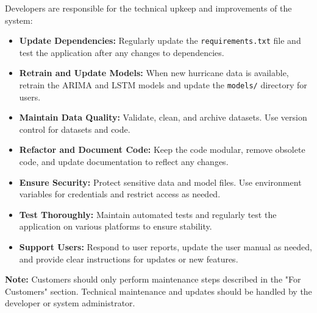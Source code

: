 Developers are responsible for the technical upkeep and improvements of the system:
\begin{itemize}
	\item \textbf{Update Dependencies:} Regularly update the \texttt{requirements.txt} file and test the application after any changes to dependencies.
	\item \textbf{Retrain and Update Models:} When new hurricane data is available, retrain the ARIMA and LSTM models and update the \texttt{models/} directory for users.
	\item \textbf{Maintain Data Quality:} Validate, clean, and archive datasets. Use version control for datasets and code.
	\item \textbf{Refactor and Document Code:} Keep the code modular, remove obsolete code, and update documentation to reflect any changes.
	\item \textbf{Ensure Security:} Protect sensitive data and model files. Use environment variables for credentials and restrict access as needed.
	\item \textbf{Test Thoroughly:} Maintain automated tests and regularly test the application on various platforms to ensure stability.
	\item \textbf{Support Users:} Respond to user reports, update the user manual as needed, and provide clear instructions for updates or new features.
\end{itemize}

\textbf{Note:} Customers should only perform maintenance steps described in the "For Customers" section. Technical maintenance and updates should be handled by the developer or system administrator.

